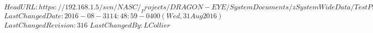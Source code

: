 \svnidlong
{$HeadURL: https://192.168.1.5/svn/NASC/_Projects/DRAGON-EYE/SystemDocuments/zSystemWideData/TestPrepProcs/TestCasePost_AllRecords.tex $}
{$LastChangedDate: 2016-08-31 14:48:59 -0400 (Wed, 31 Aug 2016) $}
{$LastChangedRevision: 316 $}
{$LastChangedBy: LCollier $}



